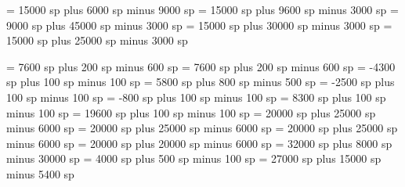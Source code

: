 \greintersyllablespace= 15000 sp plus 6000 sp minus 9000 sp
\greinterwordspacenotes = 15000 sp plus 9600 sp minus 3000 sp
\greinterwordspacenotestext = 9000 sp plus 45000 sp minus 3000 sp
\greinterwordspacetextnotes = 15000 sp plus 30000 sp minus 3000 sp
\greinterwordspacetext = 15000 sp plus 25000 sp minus 3000 sp

\grebitrivirspace = 7600 sp plus 200 sp minus 600 sp
\grebitristrospace = 7600 sp plus 200 sp minus 600 sp
\grepunctuminclinatumshift= -4300 sp plus 100 sp minus 100 sp
\grebeforepunctainclinatashift= 5800 sp plus 800 sp minus 500 sp
\grepunctuminclinatumanddebilisshift= -2500 sp plus 100 sp minus 100 sp
\grepunctuminclinatumdebilisshift= -800 sp plus 100 sp minus 100 sp
\grepunctuminclinatumbigshift= 8300 sp plus 100 sp minus 100 sp
\grepunctuminclinatummaxshift= 19600 sp plus 100 sp minus 100 sp
\grespacearoundsmallbar = 20000 sp plus 25000 sp minus 6000 sp
\grespacearoundminor = 20000 sp plus 25000 sp minus 6000 sp
\grespacearoundmaior = 20000 sp plus 25000 sp minus 6000 sp
\grespacearoundfinalis = 20000 sp plus 20000 sp minus 6000 sp
\grespacebeforefinalfinalis= 32000 sp plus 8000 sp minus 30000 sp
\grespacearoundclefbars= 4000 sp plus 500 sp minus 100 sp
\gretextbartextspace = 27000 sp plus 15000 sp minus 5400 sp
